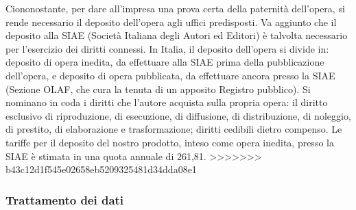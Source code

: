 Ciononostante, per dare all'impresa una prova certa della paternità dell'opera, si rende necessario il deposito dell'opera agli uffici predisposti. Va aggiunto che il deposito alla SIAE (Società Italiana degli Autori ed Editori) è talvolta necessario per l'esercizio dei diritti connessi. In Italia, il deposito dell'opera si divide in: deposito di opera inedita, da effettuare alla SIAE prima della pubblicazione dell'opera, e deposito di opera pubblicata, da effettuare ancora presso la SIAE (Sezione OLAF, che cura la tenuta di un apposito Registro pubblico). Si nominano in coda i diritti che l'autore acquista sulla propria opera: il diritto esclusivo di riproduzione, di esecuzione, di diffusione, di distribuzione, di noleggio, di prestito, di elaborazione e trasformazione; diritti cedibili dietro compenso. Le tariffe per il deposito del nostro prodotto, inteso come opera inedita, presso la SIAE è stimata in una quota annuale di 261,81\officialeuro.
>>>>>>> b43c12d1f545e02658eb5209325481d34dda08e1

\subsubsection{Trattamento dei dati}
